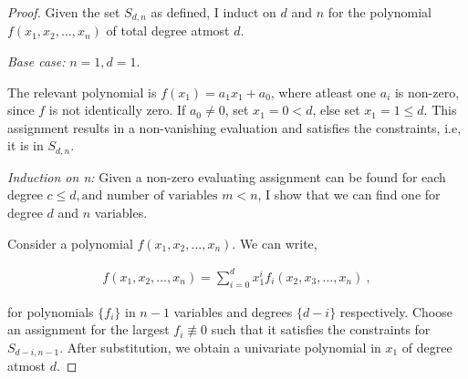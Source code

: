 \question

\begin{proof}
    Given the set \(S_{d, n}\) as defined, I induct on \(d\) and \(n\) for the
    polynomial \(f(x_1, x_2, \ldots, x_n)\) of total degree atmost \(d\).

    \emph{Base case:} \(n = 1, d = 1\).

    The relevant polynomial is \(f(x_1) = a_1 x_1 + a_0\), where atleast one
    \(a_i\) is non-zero, since \(f\) is not identically zero. If \(a_0 \not =
    0\), set \(x_1 = 0 < d\), else set \(x_1 = 1 \leq d\). This assignment
    results in a non-vanishing evaluation and satisfies the constraints, i.e, it
    is in \(S_{d, n}\).

    \emph{Induction on n:} Given a non-zero evaluating assignment can be found
    for each degree \(c \leq d, \text{and number of variables } m < n\), I show
    that we can find one for degree \(d\) and \(n\) variables.

    Consider a polynomial \(f(x_1, x_2, \ldots, x_n)\). We can write, 

    \begin{gather*}
        f(x_1, x_2, \ldots, x_n) = \sum_{i=0}^d x_1^i f_i(x_2, x_3, \ldots, x_n)~,
    \end{gather*}

    for polynomials \(\{f_i\}\) in \(n-1\) variables and degrees \(\{d-i\}\)
    respectively. Choose an assignment for the largest \(f_i \not \equiv 0\)
    such that it satisfies the constraints for \(S_{d-i, n-1}\). After substitution, 
    we obtain a univariate polynomial in \(x_1\) of degree atmost \(d\). 

\end{proof}
